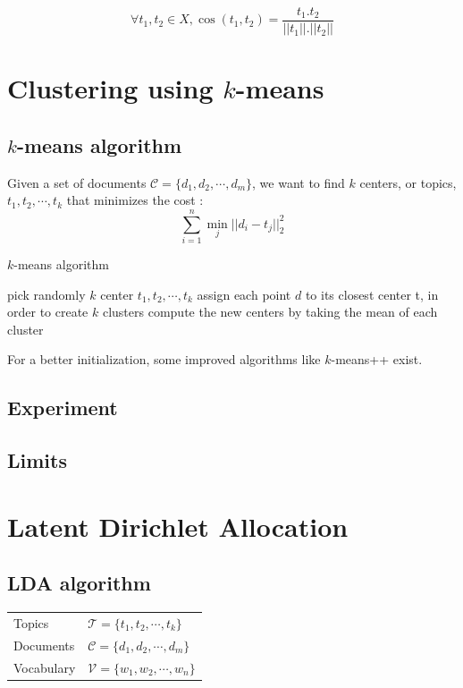\documentclass[a4paper,12pt]{report}
\begin{document}
$$ \forall t_1,t_2 \in X, \cos(t_1,t_2) = \frac{t_1.t_2}{||t_1||.||t_2||} $$

\newpage
\section{Clustering using $k$-means}

\subsection{$k$-means algorithm}
Given a set of documents $\mathcal{C} = \{d_1,d_2,\cdots,d_m\}$, we want to find $k$ centers, or topics, $t_1,t_2,\cdots,t_k$ that minimizes the cost :
$$ \sum_{i=1}^n \min_j ||d_i-t_j||_2^2 $$


\begin{algorithm}
\caption{$k$-means algorithm}
\label{algo:kmeans}
\begin{algorithmic} 
\STATE pick randomly $k$ center ${t_1,t_2,\cdots,t_k}$
\REPEAT
\STATE assign each point $d$ to its closest center t, in order to create $k$ clusters
\STATE compute the new centers by taking the mean of each cluster
\end{algorithmic}
\end{algorithm}

For a better initialization, some improved algorithms like $k$-means++ exist.


\subsection{Experiment}

\subsection{Limits}

\newpage
\section{Latent Dirichlet Allocation}

\subsection{LDA algorithm}

\begin{center}
\begin{tabular}{ll}
Topics & $ \mathcal{T} = \{t_1,t_2,\cdots,t_k\} $ \\
Documents & $ \mathcal{C} = \{d_1,d_2,\cdots,d_m\} $ \\
Vocabulary & $ \mathcal{V} = \{w_1,w_2,\cdots,w_n\} $ \\
\end{tabular}
\end{center}
\end{document}
